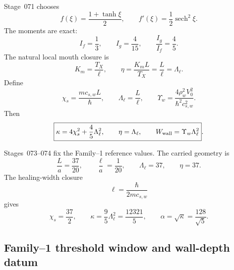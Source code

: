 Stage~071 chooses
\begin{equation}
\label{eq:part03-tanh-wall}
f(\xi)=\frac{1+\tanh\xi}{2},
\qquad
f'(\xi)=\frac12\operatorname{sech}^2\xi.
\end{equation}
The moments are exact:
\begin{equation}
\label{eq:part03-If-Ig-tanh}
I_f=\frac13,
\qquad
I_g=\frac{4}{15},
\qquad
\frac{I_g}{I_f}=\frac45.
\end{equation}
The natural local mouth closure is
\begin{equation}
\label{eq:part03-local-mouth}
K_m=\frac{T_X}{\ell},
\qquad
\eta=\frac{K_mL}{T_X}=\frac{L}{\ell}=\Lambda_\ell.
\end{equation}
Define
\begin{equation}
\label{eq:part03-branch-controls}
\chi_s=\frac{mc_{s,w}L}{\hbar},
\qquad
\Lambda_\ell=\frac{L}{\ell},
\qquad
\Upsilon_w=\frac{4\rho_w^2V_0^2}{\hbar^2c_{s,w}^2}.
\end{equation}
Then
\begin{equation}
\label{eq:part03-canonical-branch-controls}
\boxed{
\kappa=4\chi_s^2+\frac45\Lambda_\ell^2,
\qquad
\eta=\Lambda_\ell,
\qquad
W_{\rm wall}=\Upsilon_w\Lambda_\ell^2}.
\end{equation}

Stages~073--074 fix the Family--1 reference values.  The carried geometry is
\begin{equation}
\label{eq:part03-family1-geometry}
\frac{L}{a}=\frac{37}{20},
\qquad
\frac{\ell}{a}=\frac{1}{20},
\qquad
\Lambda_\ell=37,
\qquad
\eta=37.
\end{equation}
The healing-width closure
\begin{equation}
\label{eq:part03-healing-lock}
\ell=\frac{\hbar}{2mc_{s,w}}
\end{equation}
gives
\begin{equation}
\label{eq:part03-family1-kappa}
\boxed{
\chi_s=\frac{37}{2},
\qquad
\kappa=\frac95\Lambda_\ell^2=\frac{12321}{5},
\qquad
\alpha=\sqrt\kappa=\frac{128}{\sqrt5}}.
\end{equation}

\subsection{Family--1 threshold window and wall-depth datum}
\label{subsec:part03-family1-window}

